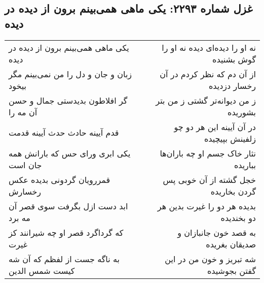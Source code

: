 \begin{center}
\section*{غزل شماره ۲۲۹۳: یکی ماهی همی‌بینم برون از دیده در دیده}
\label{sec:2293}
\begin{longtable}{l p{0.5cm} r}
یکی ماهی همی‌بینم برون از دیده در دیده
&&
نه او را دیده‌ای دیده نه او را گوش بشنیده
\\
زبان و جان و دل را من نمی‌بینم مگر بیخود
&&
از آن دم که نظر کردم در آن رخسار دزدیده
\\
گر افلاطون بدیدستی جمال و حسن آن مه را
&&
ز من دیوانه‌تر گشتی ز من بتر بشوریده
\\
قدم آیینه حادث حدث آیینه قدمت
&&
در آن آیینه این هر دو چو زلفینش بپیچیده
\\
یکی ابری ورای حس که بارانش همه جان است
&&
نثار خاک جسم او چه باران‌ها بباریده
\\
قمررویان گردونی بدیده عکس رخسارش
&&
خجل گشته از آن خوبی پس گردن بخاریده
\\
ابد دست ازل بگرفت سوی قصر آن مه برد
&&
بدیده هر دو را غیرت بدین هر دو بخندیده
\\
که گرداگرد قصر او چه شیرانند کز غیرت
&&
به قصد خون جانبازان و صدیقان بغریده
\\
به ناگه جست از لفظم که آن شه کیست شمس الدین
&&
شه تبریز و خون من در این گفتن بجوشیده
\\
\end{longtable}
\end{center}

